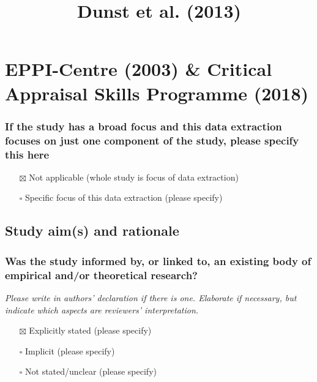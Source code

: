 \documentclass[
  doc, a4paper]{apa7}
\title{Dunst et al. (2013)}
\author{\phantom{0}}
\date{}
\affiliation{\phantom{0}}
\providecommand{\tightlist}{%
  \setlength{\itemsep}{0pt}\setlength{\parskip}{0pt}}
\begin{document}
\maketitle

\section{EPPI-Centre (2003) \& Critical Appraisal Skills Programme (2018)}\label{eppi-centrereviewguidelinesextracting2003-criticalappraisalskillsprogrammecaspsystematicreview2018}

\subsubsection{If the study has a broad focus and this data extraction focuses on just one component of the study, please specify this here}\label{if-the-study-has-a-broad-focus-and-this-data-extraction-focuses-on-just-one-component-of-the-study-please-specify-this-here}

\begin{itemize}
\tightlist
\item[$\boxtimes$]
  Not applicable (whole study is focus of data extraction)\\
\item[$\square$]
  Specific focus of this data extraction (please specify)
\end{itemize}

\subsection{Study aim(s) and rationale}\label{study-aims-and-rationale}

\subsubsection{Was the study informed by, or linked to, an existing body of empirical and/or theoretical research?}\label{was-the-study-informed-by-or-linked-to-an-existing-body-of-empirical-andor-theoretical-research}

\emph{Please write in authors' declaration if there is one. Elaborate if necessary, but indicate which aspects are reviewers' interpretation.}

\begin{itemize}
\tightlist
\item[$\boxtimes$]
  Explicitly stated (please specify)\\
\item[$\square$]
  Implicit (please specify)\\
\item[$\square$]
  Not stated/unclear (please specify)
\end{itemize}
\end{document}

